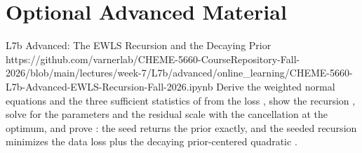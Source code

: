 \documentclass[11pt]{article}
\begin{document}
\section*{Optional Advanced Material}

\notebooklink
  {L7b Advanced: The EWLS Recursion and the Decaying Prior}
  {https://github.com/varnerlab/CHEME-5660-CourseRepository-Fall-2026/blob/main/lectures/week-7/L7b/advanced/online_learning/CHEME-5660-L7b-Advanced-EWLS-Recursion-Fall-2026.ipynb}
  {Derive the weighted normal equations and the three sufficient statistics of  from the loss , show the recursion , solve for the parameters and the residual scale  with the cancellation at the optimum, and prove : the seed returns the prior exactly, and the seeded recursion minimizes the data loss plus the decaying prior-centered quadratic .}
\end{document}
